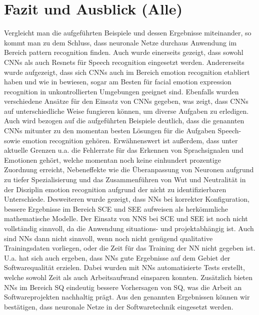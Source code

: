 \section{Fazit und Ausblick (Alle)}
Vergleicht man die aufgeführten Beispiele und dessen Ergebnisse miteinander, so kommt man zu dem Schluss, dass neuronale Netze durchaus Anwendung im Bereich pattern recognition finden. Auch wurde einerseits gezeigt, dass sowohl CNNs als auch Resnets für Speech recognition eingesetzt werden. Andererseits wurde aufgezeigt, dass sich CNNs auch im Bereich emotion recognition etabliert haben und wie in \cite{wildemotionrec} bewiesen, sogar am Besten für facial emotion expression recognition in unkontrollierten Umgebungen geeignet sind. Ebenfalls wurden verschiedene Ansätze für den Einsatz von CNNs gegeben, was zeigt, dass CNNs auf unterschiedliche Weise fungieren können, um diverse Aufgaben zu erledigen. Auch wird bezogen auf die aufgeführten Beispiele deutlich, dass die genannten CNNs mitunter zu den momentan besten Lösungen für die Aufgaben Speech- sowie emotion recognition gehören. Erwähnenswert ist außerdem, dass unter aktuelle Grenzen u.a. die Fehlerrate für das Erkennen von Sprachsignalen und Emotionen gehört, welche momentan noch keine einhundert prozentige Zuordnung erreicht, Nebeneffekte wie die Überanpassung von Neuronen aufgrund zu tiefer Spezialisierung und das Zusammenführen von Wut und Neutralität in der Disziplin emotion recognition aufgrund der nicht zu identifizierbaren Unterschiede. Desweiteren wurde gezeigt, dass NNs bei korrekter Konfiguration, bessere Ergebnisse im Bereich SCE und SEE aufweisen als herkömmliche mathematische Modelle. Der Einsatz von NNS bei SCE und SEE ist noch nicht vollständig sinnvoll, da die Anwendung situations- und projektabhängig ist. Auch sind NNs dann nicht sinnvoll, wenn noch nicht genügend qualitative Trainingsdaten vorliegen, oder die Zeit für das Training der NN nicht gegeben ist.
U.a. hat sich auch ergeben, dass NNs gute Ergebnisse auf dem Gebiet der Softwarequalität erzielen. Dabei wurden mit NNs automatisierte Tests erstellt, welche sowohl Zeit als auch Arbeitsaufwand einsparen konnten. Zusätzlich bieten NNs im Bereich SQ eindeutig bessere Vorhersagen von SQ, was die Arbeit an Softwareprojekten nachhaltig prägt. Aus den genannten Ergebnissen können wir bestätigen, dass neuronale Netze in der Softwaretechnik eingesetzt werden.